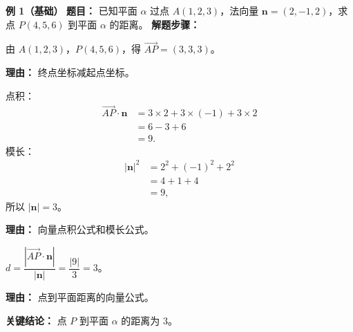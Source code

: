 \begin{examplebox}
	\textbf{\textcolor{CExample}{例 1（基础）}}
	\textbf{\textcolor{CExample}{题目：}}
	已知平面 $\alpha$ 过点 $A(1,2,3)$，法向量 $\mathbf{n}=(2,-1,2)$，求点 $P(4,5,6)$ 到平面 $\alpha$ 的距离。
	\textbf{\textcolor{CExample}{解题步骤：}}
	\begin{description}[style=nextline, leftmargin=2.8em, labelsep=0.5em, itemsep=0.45em]
		\item[\textbf{第一步（计算向量 $\vec{AP}$）：}]
			由 $A(1,2,3)$，$P(4,5,6)$，得 $\vec{AP}=(3,3,3)$。
			\par\textbf{理由：} 终点坐标减起点坐标。
		\item[\textbf{第二步（计算点积与模长）：}]
			点积：
			\[
				\begin{aligned}
					\vec{AP}\cdot\mathbf{n} &= 3\times2+3\times(-1)+3\times2 \\&= 6-3+6 \\&= 9.
			\end{aligned}
			\]
			模长：
			\[
				\begin{aligned}
					|\mathbf{n}|^2 &= 2^2+(-1)^2+2^2 \\&= 4+1+4 \\&= 9,
			\end{aligned}
			\]
			所以 $|\mathbf{n}|=3$。
			\par\textbf{理由：} 向量点积公式和模长公式。
		\item[\textbf{第三步（代入距离公式）：}]
			$d=\dfrac{|\vec{AP}\cdot\mathbf{n}|}{|\mathbf{n}|}=\dfrac{|9|}{3}=3$。
			\par\textbf{理由：} 点到平面距离的向量公式。
	\end{description}
	\textbf{\textcolor{CExample}{关键结论：}}
	点 $P$ 到平面 $\alpha$ 的距离为 \textbf{$3$}。


\end{examplebox}
